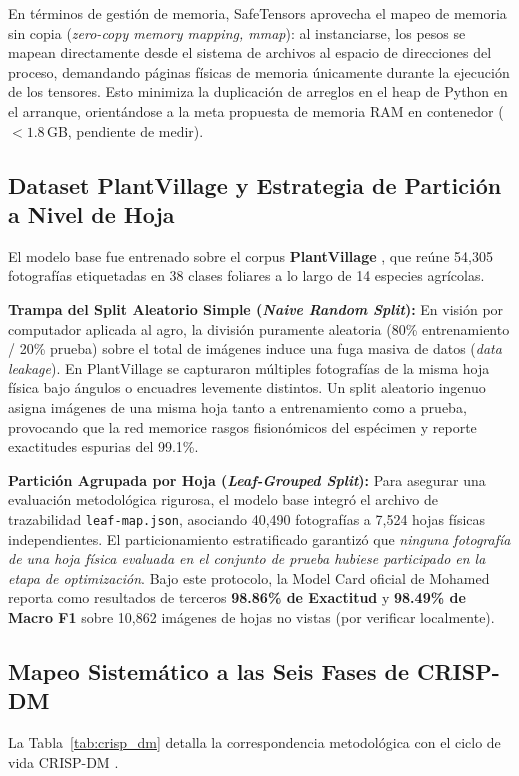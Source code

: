 \documentclass[12pt,letterpaper]{article}
\begin{document}
En términos de gestión de memoria, SafeTensors aprovecha el mapeo de memoria sin copia (\textit{zero-copy memory mapping, mmap}): al instanciarse, los pesos se mapean directamente desde el sistema de archivos al espacio de direcciones del proceso, demandando páginas físicas de memoria únicamente durante la ejecución de los tensores. Esto minimiza la duplicación de arreglos en el heap de Python en el arranque, orientándose a la meta propuesta de memoria RAM en contenedor ($< 1.8$\,GB, pendiente de medir).

\subsection{Dataset PlantVillage y Estrategia de Partición a Nivel de Hoja}
El modelo base fue entrenado sobre el corpus \textbf{PlantVillage} \cite{hughes2015open, mohanty2016using}, que reúne 54,305 fotografías etiquetadas en 38 clases foliares a lo largo de 14 especies agrícolas. 

\textbf{Trampa del Split Aleatorio Simple (\textit{Naive Random Split}):} En visión por computador aplicada al agro, la división puramente aleatoria (80\% entrenamiento / 20\% prueba) sobre el total de imágenes induce una fuga masiva de datos (\textit{data leakage}). En PlantVillage se capturaron múltiples fotografías de la misma hoja física bajo ángulos o encuadres levemente distintos. Un split aleatorio ingenuo asigna imágenes de una misma hoja tanto a entrenamiento como a prueba, provocando que la red memorice rasgos fisionómicos del espécimen y reporte exactitudes espurias del 99.1\%.

\textbf{Partición Agrupada por Hoja (\textit{Leaf-Grouped Split}):} Para asegurar una evaluación metodológica rigurosa, el modelo base integró el archivo de trazabilidad \texttt{leaf-map.json}, asociando 40,490 fotografías a 7,524 hojas físicas independientes. El particionamiento estratificado garantizó que \textit{ninguna fotografía de una hoja física evaluada en el conjunto de prueba hubiese participado en la etapa de optimización}. Bajo este protocolo, la Model Card oficial de Mohamed \cite{mohamed2024plant} reporta como resultados de terceros \textbf{98.86\% de Exactitud} y \textbf{98.49\% de Macro F1} sobre 10,862 imágenes de hojas no vistas (por verificar localmente).

\subsection{Mapeo Sistemático a las Seis Fases de CRISP-DM}
La Tabla~\ref{tab:crisp_dm} detalla la correspondencia metodológica con el ciclo de vida CRISP-DM \cite{chapman2000crisp}.
\end{document}
